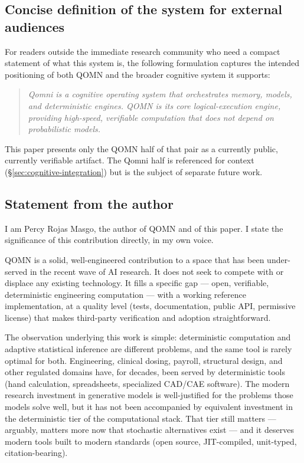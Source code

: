 \documentclass[11pt,a4paper]{article}
\begin{document}
\begin{enumerate}[leftmargin=*]
\subsection{Concise definition of the system for external audiences}
\label{sec:definition}

For readers outside the immediate research community who need a compact statement of what this system is, the following formulation captures the intended positioning of both QOMN and the broader cognitive system it supports:

\begin{quote}
\emph{Qomni is a cognitive operating system that orchestrates memory, models, and deterministic engines. QOMN is its core logical-execution engine, providing high-speed, verifiable computation that does not depend on probabilistic models.}
\end{quote}

This paper presents only the QOMN half of that pair as a currently public, currently verifiable artifact. The Qomni half is referenced for context (\S\ref{sec:cognitive-integration}) but is the subject of separate future work.

\subsection{Statement from the author}

I am Percy Rojas Masgo, the author of QOMN and of this paper. I state the significance of this contribution directly, in my own voice.

QOMN is a solid, well-engineered contribution to a space that has been under-served in the recent wave of AI research. It does not seek to compete with or displace any existing technology. It fills a specific gap --- open, verifiable, deterministic engineering computation --- with a working reference implementation, at a quality level (tests, documentation, public API, permissive license) that makes third-party verification and adoption straightforward.

The observation underlying this work is simple: deterministic computation and adaptive statistical inference are different problems, and the same tool is rarely optimal for both. Engineering, clinical dosing, payroll, structural design, and other regulated domains have, for decades, been served by deterministic tools (hand calculation, spreadsheets, specialized CAD/CAE software). The modern research investment in generative models is well-justified for the problems those models solve well, but it has not been accompanied by equivalent investment in the deterministic tier of the computational stack. That tier still matters --- arguably, matters more now that stochastic alternatives exist --- and it deserves modern tools built to modern standards (open source, JIT-compiled, unit-typed, citation-bearing).


\end{enumerate}
\end{document}
